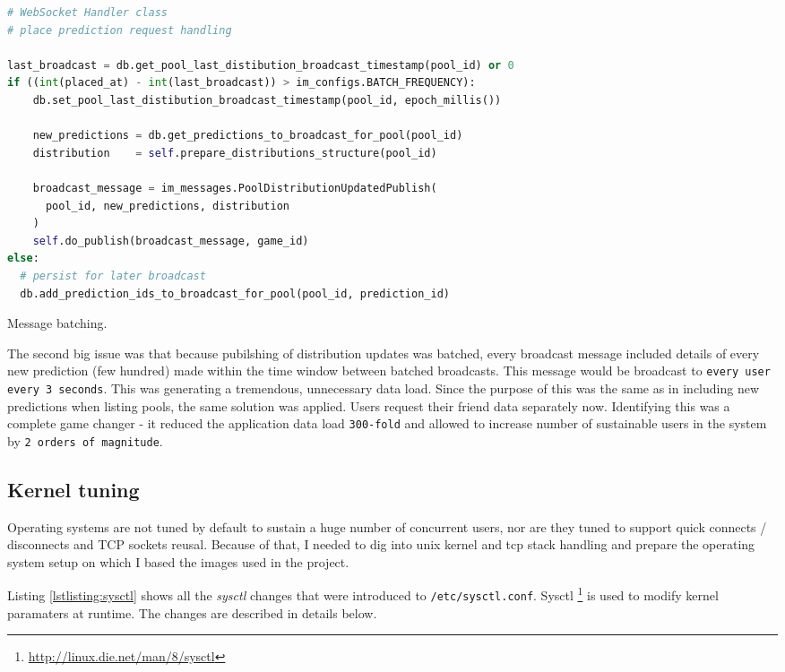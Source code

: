 \documentclass{uvamscse}
\begin{document}
\begin{sourcecode}[h]
\begin{lstlisting}[style=mono,language=Python]
# WebSocket Handler class
# place prediction request handling

last_broadcast = db.get_pool_last_distibution_broadcast_timestamp(pool_id) or 0
if ((int(placed_at) - int(last_broadcast)) > im_configs.BATCH_FREQUENCY):
    db.set_pool_last_distibution_broadcast_timestamp(pool_id, epoch_millis())

    new_predictions = db.get_predictions_to_broadcast_for_pool(pool_id)
    distribution    = self.prepare_distributions_structure(pool_id)

    broadcast_message = im_messages.PoolDistributionUpdatedPublish(
      pool_id, new_predictions, distribution
    )
    self.do_publish(broadcast_message, game_id)
else:
  # persist for later broadcast
  db.add_prediction_ids_to_broadcast_for_pool(pool_id, prediction_id)
\end{lstlisting}
\caption{Message batching.}
\label{lstlisting:batching}
\end{sourcecode}

The second big issue was that because pubilshing of distribution updates was batched, every broadcast message included details of every new prediction (few hundred) made within the time window between batched broadcasts. This message would be broadcast to \texttt{every user every 3 seconds}. This was generating a tremendous, unnecessary data load. Since the purpose of this was the same as in including new predictions when listing pools, the same solution was applied. Users request their friend data separately now. Identifying this was a complete game changer - it reduced the application data load \texttt{300-fold} and allowed to increase number of sustainable users in the system by \texttt{2 orders of magnitude}.

\subsection{Kernel tuning}\label{Kernel tuning}
Operating systems are not tuned by default to sustain a huge number of concurrent users, nor are they tuned to support quick connects / disconnects and TCP sockets reusal. Because of that, I needed to dig into unix kernel and tcp stack handling and prepare the operating system setup on which I based the images used in the project.

Listing \ref{lstlisting:sysctl} shows all the \textit{sysctl} changes that were introduced to \texttt{/etc/sysctl.conf}. Sysctl \footnote{\url{http://linux.die.net/man/8/sysctl}} is used to modify kernel paramaters at runtime. The changes are described in details below.
\end{document}
